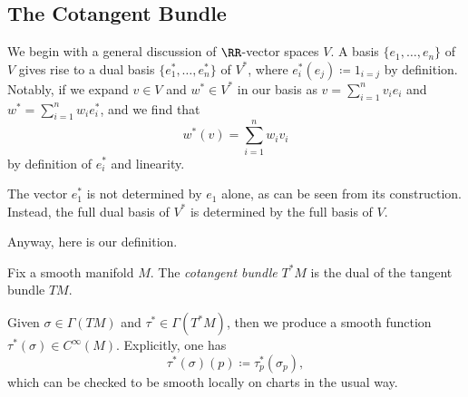 \documentclass[../notes.tex]{subfiles}
\begin{document}
\subsection{The Cotangent Bundle}
We begin with a general discussion of $\RR$-vector spaces $V$. A basis $\{e_1,\ldots,e_n\}$ of $V$ gives rise to a dual basis $\{e_1^*,\ldots,e_n^*\}$ of $V^*$, where $e_i^*(e_j)\coloneqq1_{i=j}$ by definition. Notably, if we expand $v\in V$ and $w^*\in V^*$ in our basis as $v=\sum_{i=1}^nv_ie_i$ and $w^*=\sum_{i=1}^nw_ie_i^*$, and we find that
\[w^*(v)=\sum_{i=1}^nw_iv_i\]
by definition of $e_i^*$ and linearity.
\begin{remark}
	The vector $e_1^*$ is not determined by $e_1$ alone, as can be seen from its construction. Instead, the full dual basis of $V^*$ is determined by the full basis of $V$.
\end{remark}
Anyway, here is our definition.
\begin{definition}
	Fix a smooth manifold $M$. The \textit{cotangent bundle} $T^*M$ is the dual of the tangent bundle $TM$.
\end{definition}
\begin{remark}
	Given $\sigma\in\Gamma(TM)$ and $\tau^*\in\Gamma(T^*M)$, then we produce a smooth function $\tau^*(\sigma)\in C^\infty(M)$. Explicitly, one has
	\[\tau^*(\sigma)(p)\coloneqq\tau^*_p(\sigma_p),\]
	which can be checked to be smooth locally on charts in the usual way.
\end{remark}
\end{document}
